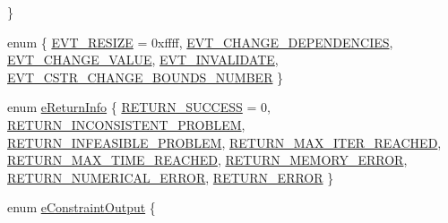 \begin{DoxyCompactItemize}
 \}
\item 
enum \{ \newline
\hyperlink{namespaceocra_a8187c7d0d2534546e0d40cec907fd2afaa1e5a7229a0919e8293186bc209feaca}{E\+V\+T\+\_\+\+R\+E\+S\+I\+ZE} = 0xffff, 
\hyperlink{namespaceocra_a8187c7d0d2534546e0d40cec907fd2afa80aa9b8c08be776fa6311d36fa4abae6}{E\+V\+T\+\_\+\+C\+H\+A\+N\+G\+E\+\_\+\+D\+E\+P\+E\+N\+D\+E\+N\+C\+I\+ES}, 
\hyperlink{namespaceocra_a8187c7d0d2534546e0d40cec907fd2afa0fa5a444737c2da3218185c3773c82ee}{E\+V\+T\+\_\+\+C\+H\+A\+N\+G\+E\+\_\+\+V\+A\+L\+UE}, 
\hyperlink{namespaceocra_a8187c7d0d2534546e0d40cec907fd2afa8fc3809ad64158601c1a7193d2e96cbe}{E\+V\+T\+\_\+\+I\+N\+V\+A\+L\+I\+D\+A\+TE}, 
\newline
\hyperlink{namespaceocra_a8187c7d0d2534546e0d40cec907fd2afa418e9564ea4db522807913b59f5656bb}{E\+V\+T\+\_\+\+C\+S\+T\+R\+\_\+\+C\+H\+A\+N\+G\+E\+\_\+\+B\+O\+U\+N\+D\+S\+\_\+\+N\+U\+M\+B\+ER}
 \}
\item 
enum \hyperlink{namespaceocra_aa1d873ac30cb0a0f79ba978745de294b}{e\+Return\+Info} \{ \newline
\hyperlink{namespaceocra_aa1d873ac30cb0a0f79ba978745de294ba6f454cdffb1de3687ef88c58b589b3f6}{R\+E\+T\+U\+R\+N\+\_\+\+S\+U\+C\+C\+E\+SS} = 0, 
\hyperlink{namespaceocra_aa1d873ac30cb0a0f79ba978745de294bac4551471e9999a6188cc9956eded36ca}{R\+E\+T\+U\+R\+N\+\_\+\+I\+N\+C\+O\+N\+S\+I\+S\+T\+E\+N\+T\+\_\+\+P\+R\+O\+B\+L\+EM}, 
\hyperlink{namespaceocra_aa1d873ac30cb0a0f79ba978745de294ba550a18591f136d331fb9aea56a9c6e44}{R\+E\+T\+U\+R\+N\+\_\+\+I\+N\+F\+E\+A\+S\+I\+B\+L\+E\+\_\+\+P\+R\+O\+B\+L\+EM}, 
\hyperlink{namespaceocra_aa1d873ac30cb0a0f79ba978745de294ba83f31480bfdb12ce0c8068849f8465cc}{R\+E\+T\+U\+R\+N\+\_\+\+M\+A\+X\+\_\+\+I\+T\+E\+R\+\_\+\+R\+E\+A\+C\+H\+ED}, 
\newline
\hyperlink{namespaceocra_aa1d873ac30cb0a0f79ba978745de294ba2ad934267c33a06b2b0ab939d6573657}{R\+E\+T\+U\+R\+N\+\_\+\+M\+A\+X\+\_\+\+T\+I\+M\+E\+\_\+\+R\+E\+A\+C\+H\+ED}, 
\hyperlink{namespaceocra_aa1d873ac30cb0a0f79ba978745de294bae948ae7318b9583ce4fe36c9c53a8b35}{R\+E\+T\+U\+R\+N\+\_\+\+M\+E\+M\+O\+R\+Y\+\_\+\+E\+R\+R\+OR}, 
\hyperlink{namespaceocra_aa1d873ac30cb0a0f79ba978745de294bac58b844581bd308fbf6c4766c216af7d}{R\+E\+T\+U\+R\+N\+\_\+\+N\+U\+M\+E\+R\+I\+C\+A\+L\+\_\+\+E\+R\+R\+OR}, 
\hyperlink{namespaceocra_aa1d873ac30cb0a0f79ba978745de294ba839fc54ee2fcde2a0a62f60c18bccd89}{R\+E\+T\+U\+R\+N\+\_\+\+E\+R\+R\+OR}
 \}
\item 
enum \hyperlink{namespaceocra_abc43c1cc74267805f1cc799c4ac27051}{e\+Constraint\+Output} \{ \newline

\end{DoxyCompactItemize}
